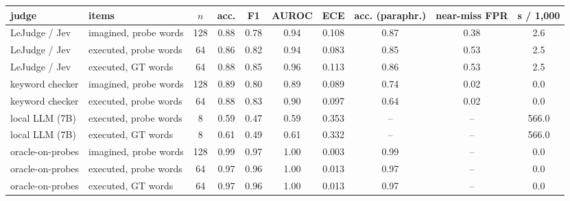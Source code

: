 \begin{tabular}{llcccccccc}
\toprule
judge & items & $n$ & acc. & F1 & AUROC & ECE & acc. (paraphr.) & near-miss FPR & s / 1{,}000 \\
\midrule
LeJudge / Jev & imagined, probe words & 128 & 0.88 & 0.78 & 0.94 & 0.108 & 0.87 & 0.38 & 2.6 \\
LeJudge / Jev & executed, probe words & 64 & 0.86 & 0.82 & 0.94 & 0.083 & 0.85 & 0.53 & 2.5 \\
LeJudge / Jev & executed, GT words & 64 & 0.88 & 0.85 & 0.96 & 0.113 & 0.86 & 0.53 & 2.5 \\
keyword checker & imagined, probe words & 128 & 0.89 & 0.80 & 0.89 & 0.089 & 0.74 & 0.02 & 0.0 \\
keyword checker & executed, probe words & 64 & 0.88 & 0.83 & 0.90 & 0.097 & 0.64 & 0.02 & 0.0 \\
local LLM (7B) & executed, probe words & 8 & 0.59 & 0.47 & 0.59 & 0.353 & -- & -- & 566.0 \\
local LLM (7B) & executed, GT words & 8 & 0.61 & 0.49 & 0.61 & 0.332 & -- & -- & 566.0 \\
oracle-on-probes & imagined, probe words & 128 & 0.99 & 0.97 & 1.00 & 0.003 & 0.99 & -- & 0.0 \\
oracle-on-probes & executed, probe words & 64 & 0.97 & 0.96 & 1.00 & 0.013 & 0.97 & -- & 0.0 \\
oracle-on-probes & executed, GT words & 64 & 0.97 & 0.96 & 1.00 & 0.013 & 0.97 & -- & 0.0 \\
\bottomrule
\end{tabular}